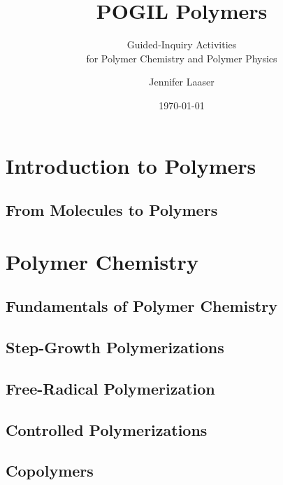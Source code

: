 \documentclass[book]{pogil}
\author{Jennifer Laaser}
\title{POGIL Polymers}
\subtitle{Guided-Inquiry Activities \\for Polymer Chemistry and Polymer Physics}
\date{\today}
\begin{document}
\frontmatter
\pagestyle{empty}
\titlepage
\clearpage

\copyrightpage
\clearpage

\tableofcontents*
\clearpage



\mainmatter
\pagestyle{fancy}

\part{Introduction to Polymers}

	\chapter{From Molecules to Polymers}
		

\part{Polymer Chemistry}

	\chapter{Fundamentals of Polymer Chemistry}

	\chapter{Step-Growth Polymerizations}
		
		
		
		

	\chapter{Free-Radical Polymerization}

	\chapter{Controlled Polymerizations}

	\chapter{Copolymers}
\end{document}
